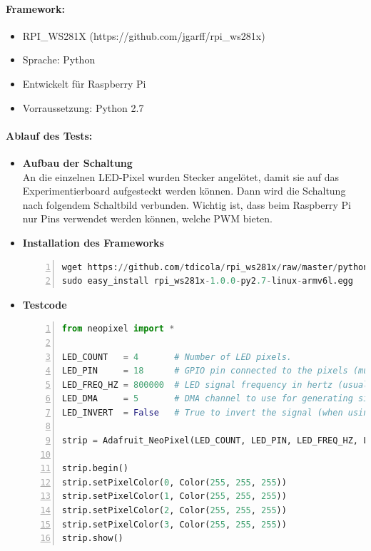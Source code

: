 \documentclass[12pt,a4paper]{scrreprt}
\begin{document}
\paragraph{Framework:}
	\begin{itemize}
	\item RPI\_WS281X (https://github.com/jgarff/rpi\_ws281x)
	\item Sprache: Python
	\item Entwickelt für Raspberry Pi
	\item Vorraussetzung: Python 2.7
	\end{itemize}
\paragraph{Ablauf des Tests:}
\begin{itemize}
\item \textbf{Aufbau der Schaltung}\\
An die einzelnen LED-Pixel wurden Stecker angelötet, damit sie auf das Experimentierboard aufgesteckt werden können. Dann wird die Schaltung nach folgendem Schaltbild verbunden. Wichtig ist, dass beim Raspberry Pi nur Pins verwendet werden können, welche PWM bieten. 
\item \textbf{Installation des Frameworks} 
\begin{lstlisting}[caption = Installation Framework ws281x, language=Python, frame=single, breaklines=true,columns=fullflexible, commentstyle=\color{gray}\upshape, captionpos=b, numbers = left]
wget https://github.com/tdicola/rpi_ws281x/raw/master/python/dist/rpi_ws281x-1.0.0-py2.7-linux-armv6l.egg 
sudo easy_install rpi_ws281x-1.0.0-py2.7-linux-armv6l.egg
\end{lstlisting}
\item \textbf{Testcode}

\begin{lstlisting}[caption = Testcode zur Ansteuerung der LEDs, language=python, frame=single, breaklines=true,columns=fullflexible, commentstyle=\color{gray}\upshape, captionpos=b, numbers = left]
from neopixel import * 
	
LED_COUNT   = 4       # Number of LED pixels. 
LED_PIN     = 18      # GPIO pin connected to the pixels (must support PWM!).
LED_FREQ_HZ = 800000  # LED signal frequency in hertz (usually 800khz)
LED_DMA     = 5       # DMA channel to use for generating signal (try 5)
LED_INVERT  = False   # True to invert the signal (when using NPN)

strip = Adafruit_NeoPixel(LED_COUNT, LED_PIN, LED_FREQ_HZ, LED_DMA, LED_INVERT)

strip.begin()
strip.setPixelColor(0, Color(255, 255, 255))
strip.setPixelColor(1, Color(255, 255, 255))
strip.setPixelColor(2, Color(255, 255, 255))
strip.setPixelColor(3, Color(255, 255, 255))
strip.show()
\end{lstlisting}
\end{itemize}
\end{document}
